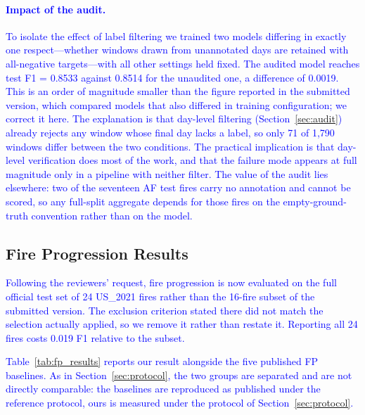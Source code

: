 \documentclass[sensors,article,submit,moreauthors,pdftex]{Definitions/mdpi}
\newcommand{\rev}[1]{\textcolor{blue}{#1}}
\begin{document}
\paragraph*{\rev{Impact of the audit.}}
\label{sec:auditeffect}
\rev{To isolate the effect of label filtering we trained two models differing in
exactly one respect---whether windows drawn from unannotated days are retained
with all-negative targets---with all other settings held fixed. The audited model
reaches test F1 = 0.8533 against 0.8514 for the unaudited one, a difference of
0.0019. This is an order of magnitude smaller than the figure reported in the
submitted version, which compared models that also differed in training
configuration; we correct it here. The explanation is that day-level filtering
(Section~\ref{sec:audit}) already rejects any window whose final day lacks a
label, so only 71 of 1{,}790 windows differ between the two conditions. The
practical implication is that day-level verification does most of the work, and
that the failure mode appears at full magnitude only in a pipeline with neither
filter. The value of the audit lies elsewhere: two of the seventeen AF test fires
carry no annotation and cannot be scored, so any full-split aggregate depends for
those fires on the empty-ground-truth convention rather than on the model.}

\subsection{Fire Progression Results}
\label{sec:fpresults}


\rev{Following the reviewers' request, fire progression is now evaluated on the
full official test set of 24 US\_2021 fires rather than the 16-fire subset of the
submitted version. The exclusion criterion stated there did not match the
selection actually applied, so we remove it rather than restate it. Reporting all
24 fires costs 0.019 F1 relative to the subset.}

\rev{Table~\ref{tab:fp_results} reports our result alongside the five published
FP baselines. As in Section~\ref{sec:protocol}, the two groups are separated and
are not directly comparable: the baselines are reproduced as published under the
reference protocol, ours is measured under the protocol of
Section~\ref{sec:protocol}.}
\end{document}
